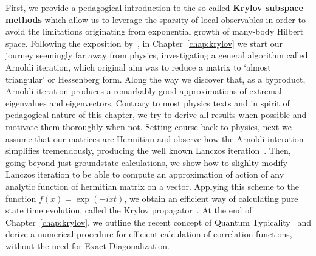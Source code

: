 First, we provide a pedagogical introduction to the so-called \textbf{Krylov subspace methods} which allow
us to leverage the sparsity of local observables
in order to avoid the limitations originating from exponential growth of many-body Hilbert space.
Following the exposition by~\textcite{Trefethen1997}, in Chapter~\ref{chap:krylov} we start our journey seemingly far away from
physics, investigating a general algorithm called Arnoldi iteration, which original aim was to reduce
a matrix to `almost triangular' or Hessenberg form. Along the way we discover that, as a byproduct,
Arnoldi iteration produces a remarkably good approximations of extremal eigenvalues and eigenvectors. Contrary
to most physics texts and in spirit of pedagogical nature of this chapter, we try to derive all results when possible
and motivate them thoroughly when not. Setting course back to physics, next we assume that our matrices are
Hermitian and observe how the Arnoldi interation simplifies tremendously, producing the well known
Lanczos iteration~\autocite{Sandvik2010}. Then, going beyond just groundstate calculations, we show how to slighlty
modify Lanczos iteration to be able to compute an approximation of action of any analytic function of hermitian
matrix on a vector. Applying this scheme to the function \(f(x) = \exp\left(-i x t\right)\), we obtain an efficient
way of calculating pure state time evolution, called the Krylov propagator~\autocite{Park1986}.
At the end of Chapter~\ref{chap:krylov}, we outline the recent concept of Quantum Typicality~\autocite{Bartsch2009}
and derive a numerical procedure for efficient calculation of correlation functions, without the need for Exact
Diagonalization.

